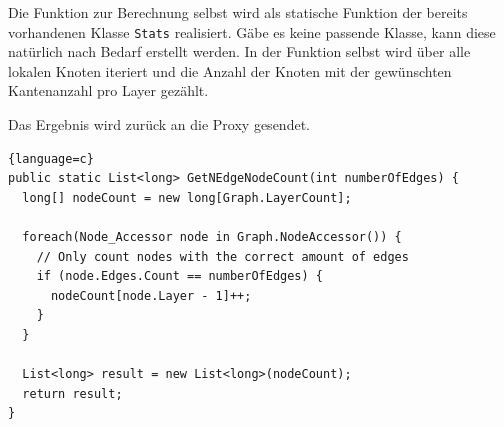 Die Funktion zur Berechnung selbst wird als statische Funktion der bereits vorhandenen Klasse \verb|Stats| realisiert. Gäbe es keine passende Klasse, kann diese natürlich nach Bedarf erstellt werden.
In der Funktion selbst wird über alle lokalen Knoten iteriert und die Anzahl der Knoten mit der gewünschten Kantenanzahl pro Layer gezählt. 

Das Ergebnis wird zurück an die Proxy gesendet.

\begin{lstlisting}{language=c}
public static List<long> GetNEdgeNodeCount(int numberOfEdges) {
  long[] nodeCount = new long[Graph.LayerCount];

  foreach(Node_Accessor node in Graph.NodeAccessor()) {
    // Only count nodes with the correct amount of edges
    if (node.Edges.Count == numberOfEdges) {
      nodeCount[node.Layer - 1]++;
    }
  }

  List<long> result = new List<long>(nodeCount);
  return result;
}
\end{lstlisting}




